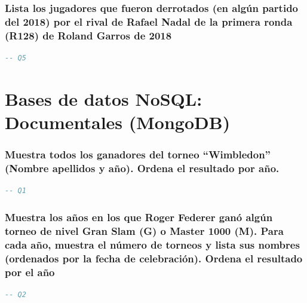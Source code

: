 \documentclass[10pt]{opticajnl}
\begin{document}
\subsubsection{Lista los jugadores que fueron derrotados (en algún partido del 2018) por el rival de Rafael Nadal de la primera ronda (R128) de Roland Garros de 2018}

\begin{lstlisting}[language=SQL]
-- Q5
\end{lstlisting}


































\section{Bases de datos NoSQL: Documentales (MongoDB)}

\subsubsection{Muestra todos los ganadores del torneo ``Wimbledon'' (Nombre apellidos y año). Ordena el resultado por año.}

\begin{lstlisting}[language=SQL]
-- Q1
\end{lstlisting}





\subsubsection{Muestra los años en los que Roger Federer ganó algún torneo de nivel Gran Slam (G) o Master 1000 (M). Para cada año, muestra el número de torneos y lista sus nombres (ordenados por la fecha de celebración). Ordena el resultado por el año}

\begin{lstlisting}[language=SQL]
-- Q2
\end{lstlisting}
\end{document}
